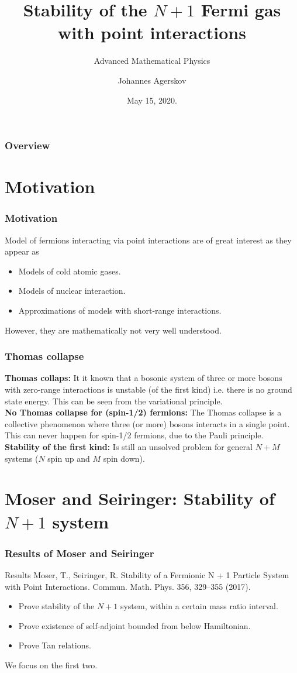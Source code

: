 \documentclass{beamer}[10]
\title{Stability of the $ N+1 $ Fermi gas with point interactions}
\subtitle{Advanced Mathematical Physics}
\author{Johannes Agerskov}
\institute{Institute for Mathematical Sciences \\ University of Copenhagen}
\date{May 15, 2020.}
\begin{document}
\frame{\titlepage \vspace{-0.5cm}
}

\frame
{
\frametitle{Overview}
\linespread{1.5}
\tableofcontents%
}
\section{Motivation}
\begin{frame}
	\frametitle{Motivation}
	Model of fermions interacting via point interactions are of great interest as they appear as
	\begin{itemize}
		\item Models of cold atomic gases.\\
		\item Models of nuclear interaction.\\
		\item Approximations of models with short-range interactions.
	\end{itemize}
	However, they are mathematically not very well understood.
\end{frame}

\begin{frame}
	\frametitle{Thomas collapse}
	\textbf{Thomas collaps:}
	It it known that a bosonic system of three or more bosons with zero-range interactions is unstable (of the first kind) i.e. there is no ground state energy. This can be seen from the variational principle.\\\vspace*{0.5cm}
	\textbf{No Thomas collapse for (spin-1/2) fermions:} The Thomas collapse is a collective phenomenon where three (or more) bosons interacts in a single point. This can never happen for spin-1/2 fermions, due to the Pauli principle.\\\vspace*{0.5cm}
	\textbf{Stability of the first kind:} Is still an unsolved problem for general $ N+M $ systems ($ N $ spin up and $ M $ spin down).
\end{frame}
\section{Moser and Seiringer: Stability of $ N+1 $ system}
\begin{frame}
	\frametitle{Results of Moser and Seiringer}
	\begin{block}{Results}
		\small Moser, T., Seiringer, R. Stability of a Fermionic N + 1 Particle System with Point Interactions. Commun. Math. Phys. 356, 329–355 (2017).\normalsize
		\begin{itemize}
			\item Prove stability of the $ N+1 $ system, within a certain mass ratio interval.
			\item Prove existence of self-adjoint bounded from below Hamiltonian.
			\item Prove Tan relations.
		\end{itemize}
	\end{block}
	We focus on the first two.
\end{frame}
\end{document}
